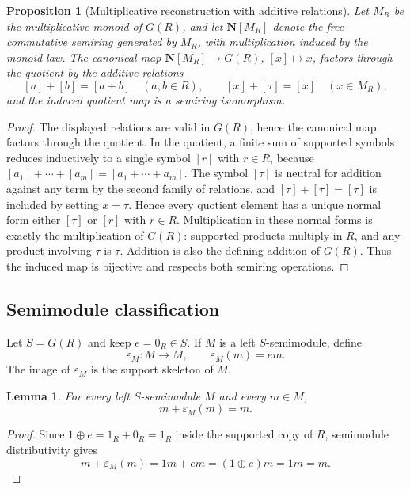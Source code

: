\documentclass[11pt]{article}
\newcommand{\N}{\mathbf N}
\newcommand{\eps}{\varepsilon}
\theoremstyle{plain}
\newtheorem{proposition}[theorem]{Proposition}
\newtheorem{lemma}[theorem]{Lemma}
\theoremstyle{definition}
\begin{document}
\begin{proposition}[Multiplicative reconstruction with additive relations]\label{prop:missing-additive-relations}
Let \(M_R\) be the multiplicative monoid of \(G(R)\), and let \(\N[M_R]\) denote the free commutative semiring generated by \(M_R\), with multiplication induced by the monoid law.  The canonical map \(\N[M_R]\to G(R)\), \([x]\mapsto x\), factors through the quotient by the additive relations
\[
 [a]+[b]=[a+b]\quad(a,b\in R),
 \qquad
 [x]+[\tau]=[x]\quad(x\in M_R),
\]
and the induced quotient map is a semiring isomorphism.
\end{proposition}

\begin{proof}
The displayed relations are valid in \(G(R)\), hence the canonical map factors through the quotient.  In the quotient, a finite sum of supported symbols reduces inductively to a single symbol \([r]\) with \(r\in R\), because \([a_1]+\cdots+[a_m]=[a_1+\cdots+a_m]\).  The symbol \([\tau]\) is neutral for addition against any term by the second family of relations, and \([\tau]+[\tau]=[\tau]\) is included by setting \(x=\tau\).  Hence every quotient element has a unique normal form either \([\tau]\) or \([r]\) with \(r\in R\).  Multiplication in these normal forms is exactly the multiplication of \(G(R)\): supported products multiply in \(R\), and any product involving \(\tau\) is \(\tau\).  Addition is also the defining addition of \(G(R)\).  Thus the induced map is bijective and respects both semiring operations.
\end{proof}

\subsection{Semimodule classification}

Let \(S=G(R)\) and keep \(e=0_R\in S\).  If \(M\) is a left \(S\)-semimodule, define
\[
   \eps_M:M\to M,
   \qquad
   \eps_M(m)=em.
\]
The image of \(\eps_M\) is the support skeleton of \(M\).

\begin{lemma}\label{lem:m-plus-eps}
For every left \(S\)-semimodule \(M\) and every \(m\in M\),
\[
   m+\eps_M(m)=m.
\]
\end{lemma}

\begin{proof}
Since \(1\oplus e=1_R+0_R=1_R\) inside the supported copy of \(R\), semimodule distributivity gives
\[
   m+\eps_M(m)=1m+em=(1\oplus e)m=1m=m.
\]
\end{proof}
\end{document}

